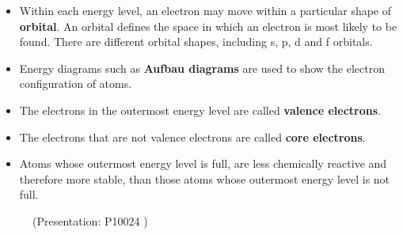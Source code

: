 \begin{itemize}[noitemsep]
\label{m38741*uid179}\item Within each energy level, an electron may move within a particular shape of \textbf{orbital}. An orbital defines the space in which an electron is most likely to be found. There are different orbital shapes, including s, p, d and f orbitals.
\label{m38741*uid180}\item Energy diagrams such as \textbf{Aufbau diagrams} are used to show the electron configuration of atoms.
\label{m38741*uid181}\item The electrons in the outermost energy level are called \textbf{valence electrons}.
\label{m38741*uid182}\item The electrons that are not valence electrons are called \textbf{core electrons}.
\label{m38741*uid183}\item Atoms whose outermost energy level is full, are less chemically reactive and therefore more stable, than those atoms whose outermost energy level is not full.
\end{itemize}
\label{m38741*eip-867}
    \setcounter{subfigure}{0}
	\begin{figure}[H] %
    \label{m38741*slidesharemedia2}\label{m38741*slideshareflash2}
             { (Presentation:  P10024 )}

 \end{figure}       \par \label{m38741*secfhsst!!!underscore!!!id1140}
            

